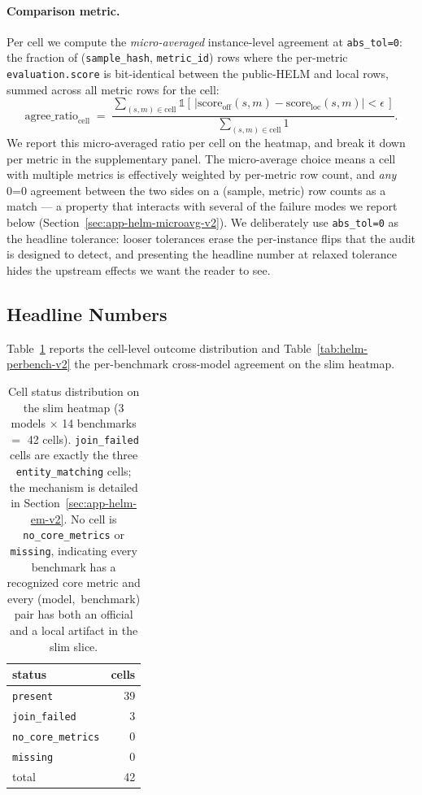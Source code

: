 \paragraph{Comparison metric.}
Per cell we compute the \emph{micro-averaged} instance-level agreement
  at \texttt{abs\_tol=0}: the fraction of (\texttt{sample\_hash},
  \texttt{metric\_id}) rows where the per-metric
  \texttt{evaluation.score} is bit-identical between the public-HELM
  and local rows, summed across all metric rows for the cell:
\[
  \mathrm{agree\_ratio}_{\mathrm{cell}}
  \;=\;
  \frac{\sum_{(s, m) \in \mathrm{cell}}
       \mathbb{1}[\,|\mathrm{score}_{\mathrm{off}}(s, m)
                  - \mathrm{score}_{\mathrm{loc}}(s, m)| < \epsilon\,]}
       {\sum_{(s, m) \in \mathrm{cell}} 1}.
\]
We report this micro-averaged ratio per cell on the heatmap, and
  break it down per metric in the supplementary panel.
The micro-average choice means a cell with multiple metrics is
  effectively weighted by per-metric row count, and \emph{any} 0=0
  agreement between the two sides on a (sample, metric) row counts as
  a match — a property that interacts with several of the failure
  modes we report below
  (Section~\ref{sec:app-helm-microavg-v2}).
We deliberately use \texttt{abs\_tol=0} as the headline tolerance:
  looser tolerances erase the per-instance flips that the audit is
  designed to detect, and presenting the headline number at relaxed
  tolerance hides the upstream effects we want the reader to see.

\subsection{Headline Numbers}
\label{sec:app-helm-headline-v2}

Table~\ref{tab:helm-cell-status-v2} reports the cell-level outcome
  distribution and Table~\ref{tab:helm-perbench-v2} the per-benchmark
  cross-model agreement on the slim heatmap.

\begin{table}[htbp]
\centering
\small
\caption{Cell status distribution on the slim heatmap (3 models $\times$
  14 benchmarks $=$ 42 cells).
\texttt{join\_failed} cells are exactly the three \texttt{entity\_matching}
  cells; the mechanism is detailed in
  Section~\ref{sec:app-helm-em-v2}.
No cell is \texttt{no\_core\_metrics} or \texttt{missing}, indicating
  every benchmark has a recognized core metric and every \mbox{(model, benchmark)}
  pair has both an official and a local artifact in the slim slice.}
\label{tab:helm-cell-status-v2}
\begin{tabular}{lr}
\toprule
status & cells \\
\midrule
\texttt{present}        & 39 \\
\texttt{join\_failed}   &  3 \\
\texttt{no\_core\_metrics} & 0 \\
\texttt{missing}        &  0 \\
\midrule
total & 42 \\
\bottomrule
\end{tabular}
\end{table}

